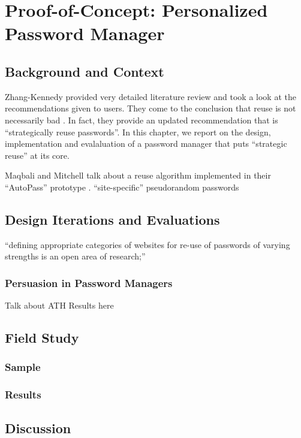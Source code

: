 \chapter[Proof-of-Concept: Personalized Password Manager]{Proof-of-Concept: Personalized Password Manager}\label{chap:pwrm}

\section{Background and Context}

Zhang-Kennedy \etal provided very detailed literature review and took a look at the recommendations given to users. They come to the conclusion that reuse is not necessarily bad \cite[p.8-9]{ZhangKennedy2016RevisitingPasswordRules}. In fact, they provide an updated recommendation that is ``strategically reuse passwords''. In this chapter, we report on the design, implementation and evalaluation of a password manager that puts ``strategic reuse'' at its core. 


Maqbali and Mitchell talk about a reuse algorithm implemented in their ``AutoPass'' prototype \cite{Maqbali2016PasswordGenerators}.
``site-specific'' pseudorandom passwords

\section{Design Iterations and Evaluations}

``defining appropriate categories of websites for re-use of passwords of varying strengths is an open area of research;'' \cite{Wash2016UnderstandingPasswordChoices} 

\subsection{Persuasion in Password Managers}
Talk about ATH Results here


\section{Field Study}
\subsection{Sample}
\subsection{Results}

\section{Discussion}

